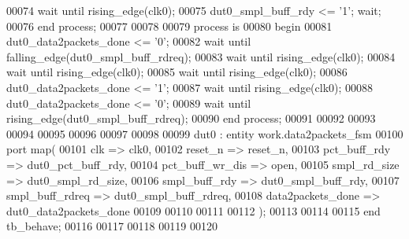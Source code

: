 \begin{DoxyCode}
00074       \textcolor{keywordflow}{wait} \textcolor{keywordflow}{until} \textcolor{vhdlchar}{rising\_edge}\textcolor{vhdlchar}{(}\textcolor{vhdlchar}{clk0}\textcolor{vhdlchar}{)};
00075         \textcolor{vhdlchar}{dut0_smpl_buff_rdy} \textcolor{vhdlchar}{<=} \textcolor{vhdlchar}{'}\textcolor{vhdllogic}{}\textcolor{vhdllogic}{1}\textcolor{vhdlchar}{'}; \textcolor{keywordflow}{wait};
00076     \textcolor{keywordflow}{end} \textcolor{keywordflow}{process};
00077    
00078    
00079     \textcolor{keywordflow}{process} \textcolor{keywordflow}{is}
00080 \textcolor{vhdlkeyword}{    begin}
00081         \textcolor{vhdlchar}{dut0_data2packets_done} \textcolor{vhdlchar}{<=} \textcolor{vhdlchar}{'}\textcolor{vhdllogic}{}\textcolor{vhdllogic}{0}\textcolor{vhdlchar}{'};
00082       \textcolor{keywordflow}{wait} \textcolor{keywordflow}{until} \textcolor{vhdlchar}{falling\_edge}\textcolor{vhdlchar}{(}\textcolor{vhdlchar}{dut0_smpl_buff_rdreq}\textcolor{vhdlchar}{)};
00083       \textcolor{keywordflow}{wait} \textcolor{keywordflow}{until} \textcolor{vhdlchar}{rising\_edge}\textcolor{vhdlchar}{(}\textcolor{vhdlchar}{clk0}\textcolor{vhdlchar}{)};
00084       \textcolor{keywordflow}{wait} \textcolor{keywordflow}{until} \textcolor{vhdlchar}{rising\_edge}\textcolor{vhdlchar}{(}\textcolor{vhdlchar}{clk0}\textcolor{vhdlchar}{)};
00085       \textcolor{keywordflow}{wait} \textcolor{keywordflow}{until} \textcolor{vhdlchar}{rising\_edge}\textcolor{vhdlchar}{(}\textcolor{vhdlchar}{clk0}\textcolor{vhdlchar}{)};
00086         \textcolor{vhdlchar}{dut0_data2packets_done} \textcolor{vhdlchar}{<=} \textcolor{vhdlchar}{'}\textcolor{vhdllogic}{}\textcolor{vhdllogic}{1}\textcolor{vhdlchar}{'};
00087       \textcolor{keywordflow}{wait} \textcolor{keywordflow}{until} \textcolor{vhdlchar}{rising\_edge}\textcolor{vhdlchar}{(}\textcolor{vhdlchar}{clk0}\textcolor{vhdlchar}{)};
00088       \textcolor{vhdlchar}{dut0_data2packets_done} \textcolor{vhdlchar}{<=} \textcolor{vhdlchar}{'}\textcolor{vhdllogic}{}\textcolor{vhdllogic}{0}\textcolor{vhdlchar}{'};
00089       \textcolor{keywordflow}{wait} \textcolor{keywordflow}{until} \textcolor{vhdlchar}{rising\_edge}\textcolor{vhdlchar}{(}\textcolor{vhdlchar}{dut0_smpl_buff_rdreq}\textcolor{vhdlchar}{)};
00090     \textcolor{keywordflow}{end} \textcolor{keywordflow}{process};
00091    
00092    
00093    
00094 
00095 
00096    
00097 
00098   
00099   dut0 : \textcolor{keywordflow}{entity} work.data2packets_fsm            
00100    \textcolor{keywordflow}{port} \textcolor{keywordflow}{map}(              
00101       clk               => clk0,
00102       reset_n           => reset_n,  
00103       pct_buff_rdy      => dut0_pct_buff_rdy,  
00104       pct_buff_wr_dis   => \textcolor{keywordflow}{open},  
00105       smpl_rd_size      => dut0_smpl_rd_size,  
00106       smpl_buff_rdy     => dut0_smpl_buff_rdy,  
00107       smpl_buff_rdreq   => dut0_smpl_buff_rdreq,  
00108       data2packets_done => dut0_data2packets_done 
00109    
00110    
00111    
00112       \textcolor{vhdlchar}{)};
00113       
00114     
00115     \textcolor{keywordflow}{end} \textcolor{vhdlchar}{tb\_behave};
00116   
00117   
00118 
00119 
00120   
\end{DoxyCode}
